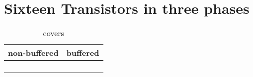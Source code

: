 \section{Sixteen Transistors in three phases}

\begin{table}[ht]
\centering
\caption*{covers}

\begin{tabular}{cc}
    \toprule
    non-buffered & buffered \\
    \midrule

    \nameref{cell:AAOOAI2213} & \nameref{cell:AAOOA2213} \\
    \nameref{cell:OOAAOI2213} & \nameref{cell:OOAAO2213} \\
    \nameref{cell:AAAOOAI2222} & \nameref{cell:AAAOOA2222} \\
    \nameref{cell:OOOAAOI2222} & \nameref{cell:OOOAAO2222}

\end{tabular}

\end{table}

 
 
 
 
